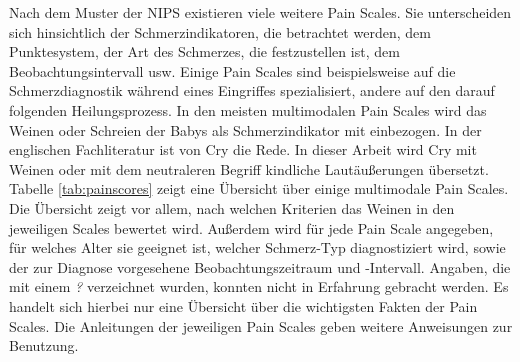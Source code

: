 Nach dem Muster der NIPS existieren viele weitere Pain Scales. Sie unterscheiden sich hinsichtlich der Schmerzindikatoren, die betrachtet werden, dem Punktesystem, der Art des Schmerzes, die festzustellen ist, dem Beobachtungsintervall usw. Einige Pain Scales sind beispielsweise auf die Schmerzdiagnostik während eines Eingriffes spezialisiert, andere auf den darauf folgenden Heilungsprozess. In den meisten multimodalen Pain Scales wird das Weinen oder Schreien der Babys als Schmerzindikator mit einbezogen. In der englischen Fachliteratur ist von \glqq Cry\grqq{} die Rede.\cite[S. 97 - 98]{painInNeonates} In dieser Arbeit wird \glqq Cry\grqq{} mit \glqq Weinen\grqq{} oder mit dem neutraleren Begriff \glqq kindliche Lautäußerungen\grqq{} übersetzt. Tabelle \ref{tab:painscores} zeigt eine Übersicht über einige multimodale Pain Scales. Die Übersicht zeigt vor allem, nach welchen Kriterien das Weinen in den jeweiligen Scales bewertet wird. Außerdem wird für jede Pain Scale angegeben, für welches Alter sie geeignet ist, welcher Schmerz-Typ diagnostiziert wird, sowie der zur Diagnose vorgesehene Beobachtungszeitraum und -Intervall. Angaben, die mit einem \emph{?} verzeichnet wurden, konnten nicht in Erfahrung gebracht werden. Es handelt sich hierbei nur eine Übersicht über die wichtigsten Fakten der Pain Scales. Die Anleitungen der jeweiligen Pain Scales geben weitere Anweisungen zur Benutzung.

